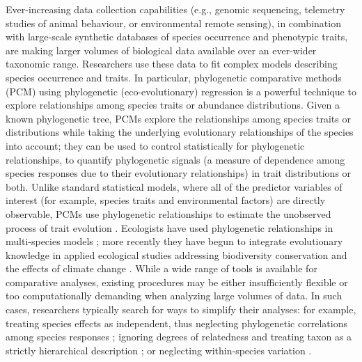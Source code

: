 \documentclass[12pt]{article}
\begin{document}
Ever-increasing data collection capabilities (e.g., genomic sequencing, telemetry studies of animal behaviour, or environmental remote sensing), in combination with large-scale synthetic databases of species occurrence and phenotypic traits, are making larger volumes of biological data available over an ever-wider taxonomic range.
Researchers use these data to fit complex models describing species occurrence and traits.
In particular, phylogenetic comparative methods (PCM) using phylogenetic (eco-evolutionary) regression \citep{hansen2012interpreting} is a powerful technique to explore relationships among species traits or abundance distributions.
Given a known phylogenetic tree, PCMs explore the relationships among species traits or distributions while taking the underlying evolutionary relationships of the species into account; they can be used to control statistically for phylogenetic relationships, to quantify phylogenetic signals (a measure of dependence among species responses due to their evolutionary relationships) in trait distributions or both.
Unlike standard statistical models, where all of the predictor variables of interest (for example, species traits and environmental factors) are directly observable,  PCMs use phylogenetic relationships to estimate the unobserved process of trait evolution \citep{felsenstein1985phylogenies, butler2004phylogenetic}. 
Ecologists have used phylogenetic relationships in multi-species models \citep{garland1992procedures, freckleton2002phylogenetic, ord2010adaptation, davies2013phylogenetic}; more recently they have begun to integrate evolutionary knowledge in applied ecological studies addressing biodiversity conservation and the effects of climate change \citep{winter2013phylogenetic, santamaria2012evolution, lankau2011incorporating, lavergne2010biodiversity, mace2008evolutionary}.
While a wide range of tools is available for comparative analyses, existing procedures may be either insufficiently flexible or too computationally demanding when analyzing large volumes of data.
In such cases, researchers typically search for ways to simplify their analyses: for example, treating species effects as independent, thus neglecting phylogenetic correlations among species responses \citep{bunnefeld2012island}; ignoring degrees of relatedness and treating taxon as a strictly hierarchical description \citep{tella1999habitat}; or neglecting within-species variation \citep{ord2010adaptation}.
\end{document}
